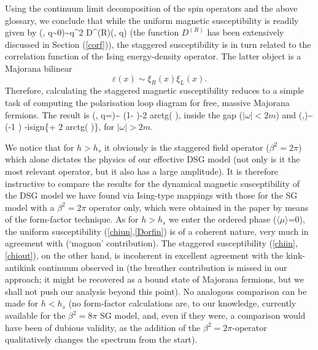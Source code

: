 Using the continuum limit decomposition of 
the spin operators and the above glossary,
we conclude that while the uniform magnetic susceptibility
is readily given by 
\be
\chi(\omega, q\sim 0)\sim q^2 D^{(R)}(\omega, q)
\label{chiun}
\ee
(the function $D^{(R)}$ has been extensively
discussed in Section (\ref{corf})),
the staggered susceptibility is in turn related to the
correlation function of the Ising energy-density operator.
The latter object is a Majorana bilinear
\[
\varepsilon(x)\sim \xi_R(x)\xi_L(x).
\]
Therefore, calculating the staggered magnetic susceptibility
reduces to a simple task of computing the polarisation
loop diagram for free, massive Majorana fermions. 
The result is 
\be
\chi(\omega, q=\pi)\sim
\ln\left(1-
\right)-2
{\rm arctg}\left(
\right),
\label{chiin}
\ee
inside the gap ($|\omega|<2m$) and
\be
\chi(\omega,\pi)\sim
\ln\left(-1
\right)
-i{\rm sign}\omega\left\{\pi+
2
{\rm arctg}\left(
\right)\right\},
\label{chiout}
\ee
for $|\omega|>2m$.

We notice that for $h>h_s$ it obviously is the
staggered field operator ($\beta^2=2\pi$) which alone
dictates the physics of our effective DSG 
model (not only is it the most relevant
operator, but it also has a large amplitude).
It is therefore instructive to compare
the results for the dynamical magnetic
susceptibility of the DSG model we
have found via Ising-type mappings with
those for the SG model with a $\beta^2=2\pi$
operator only, which were obtained in the
paper \cite{ETD} by means of the
form-factor technique. 
As for $h>h_s$ we enter the ordered phase ($\langle
\mu\rangle$=0), the uniform
susceptibility (\ref{chiun},\ref{Dorfin})
is of a coherent nature, very much
in agreement with \cite{ETD} (`magnon'
contribution). The staggered susceptibility
(\ref{chiin},\ref{chiout}), on the other
hand, is incoherent in excellent agreement
with the kink-antikink continuum observed
in \cite{ETD} (the breather contribution
is missed in our approach; it might be
recovered as a bound state of Majorana
fermions, but we shall not push our analysis
beyond this point).
No analogous comparison can be made for $h<h_s$
(no form-factor calculations are, to our
knowledge, currently available for the 
$\beta^2=8\pi$ SG model, and, even if they were,
a comparison would have been of dubious validity, 
as the addition of the $\beta^2=2\pi$-operator
qualitatively changes the spectrum from the
start).




